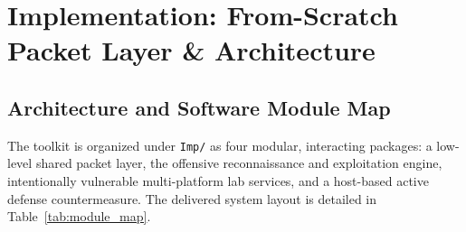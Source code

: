 \section{Implementation: From-Scratch Packet Layer \& Architecture}

\subsection{Architecture and Software Module Map}
The toolkit is organized under \texttt{Imp/} as four modular, interacting packages: a low-level
shared packet layer, the offensive reconnaissance and exploitation engine, intentionally
vulnerable multi-platform lab services, and a host-based active defense countermeasure. The
delivered system layout is detailed in Table~\ref{tab:module_map}.

